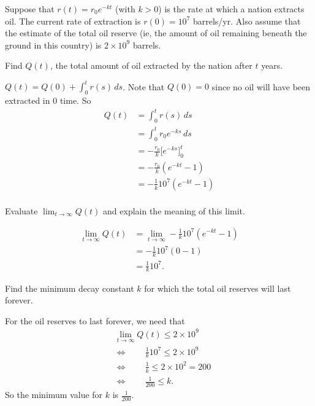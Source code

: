 \documentclass[handout, nooutcomes]{ximera}
\renewenvironment{freeResponse}{
\ifhandout\setbox0\vbox\bgroup\else
\begin{trivlist}\item[\hskip \labelsep\bfseries Solution:\hspace{2ex}]
\fi}
{\ifhandout\egroup\else
\end{trivlist}
\fi}
\renewcommand{\d}{\,d}
\newcommand{\eval}[1]{\bigg[ #1 \bigg]}
\begin{document}
\begin{problem}
Suppose that $r(t) = r_0 e^{-kt}$ (with $k>0$) is the rate at which a nation extracts oil.
The current rate of extraction is $r(0) = 10^7$ barrels/yr.
Also assume that the estimate of the total oil reserve (ie, the amount of oil remaining beneath the ground in this country) is $2 \times 10^9$ barrels.

	\begin{enumerate}

	\item  Find $Q(t)$, the total amount of oil extracted by the nation after $t$ years.
		\begin{freeResponse}
		$Q(t) = Q(0) + \int_0^t r(s) \d s$.  Note that $Q(0)=0$ since no oil will have been extracted in $0$ time.  So
			\begin{align*}
			Q(t) &= \int_0^t r(s) \d s  \\
			&= \int_0^t r_0 e^{-ks} \d s  \\
			&= - \frac{r_0}{k} \eval{e^{-ks}}_0^t  \\
			&= - \frac{r_0}{k} \left( e^{-kt} - 1 \right)  \\
			&= - \frac{1}{k} 10^7 \left(e^{-kt}-1 \right)  \\
			\end{align*}
		\end{freeResponse}

	\item  Evaluate $\lim_{t \to \infty} Q(t)$ and explain the meaning of this limit.
		\begin{freeResponse}
			\begin{align*}
			\lim_{t \to \infty} Q(t) &= \lim_{t \to \infty} - \frac{1}{k} 10^7 \left(e^{-kt}-1 \right)  \\
			&= - \frac{1}{k} 10^7 (0-1)  \\
			&= \frac{1}{k} 10^7.
			\end{align*}
		\end{freeResponse}

	\item  Find the minimum decay constant $k$ for which the total oil reserves will last forever.
		\begin{freeResponse}
		For the oil reserves to last forever, we need that
			\begin{align*}
			&\lim_{t \to \infty} Q(t) \leq 2 \times 10^9  \\
			 &\Longleftrightarrow \qquad \frac{1}{k} 10^7 \leq 2 \times 10^9  \\
			 &\Longleftrightarrow \qquad \frac{1}{k} \leq 2 \times 10^2 = 200  \\
			 &\Longleftrightarrow \qquad \frac{1}{200} \leq k.
			\end{align*}
		So the minimum value for $k$ is $\frac{1}{200}$.
		\end{freeResponse}


\end{enumerate}
\end{problem}
\end{document}
